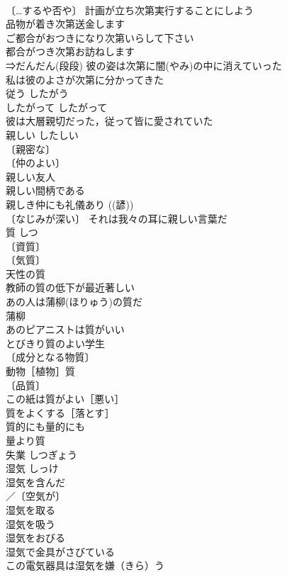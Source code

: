 \documentclass[8pt]{extreport}
\begin{document}
\begin{CJK}{UTF8}{min}
\\	〔…するや否や〕 計画が立ち次第実行することにしよう 
\\	品物が着き次第送金します 
\\	ご都合がおつきになり次第いらして下さい 
\\	都合がつき次第お訪ねします 
\\	⇒だんだん(段段) 彼の姿は次第に闇(やみ)の中に消えていった 
\\	私は彼のよさが次第に分かってきた 
\\	従う	したがう	
\\	したがって	したがって	
\\	彼は大層親切だった，従って皆に愛されていた 
\\	親しい	したしい	
\\	〔親密な〕
\\	〔仲のよい〕
\\	親しい友人 
\\	親しい間柄である 
\\	親しき仲にも礼儀あり ((諺)) 
\\	〔なじみが深い〕 それは我々の耳に親しい言葉だ 
\\	質	しつ	
\\	〔資質〕
\\	〔気質〕
\\	天性の質 
\\	教師の質の低下が最近著しい 
\\	あの人は蒲柳(ほりゅう)の質だ 
\\	蒲柳 
\\	あのピアニストは質がいい 
\\	とびきり質のよい学生 
\\	〔成分となる物質〕
\\	動物［植物］質 
\\	〔品質〕
\\	この紙は質がよい［悪い］ 
\\	質をよくする［落とす］ 
\\	質的にも量的にも 
\\	量より質 
\\	失業	しつぎょう	
\\	湿気	しっけ	
\\	湿気を含んだ 
\\	／〔空気が〕
\\	湿気を取る 
\\	湿気を吸う 
\\	湿気をおびる 
\\	湿気で金具がさびている 
\\	この電気器具は湿気を嫌（きら）う 

\end{CJK}
\end{document}

